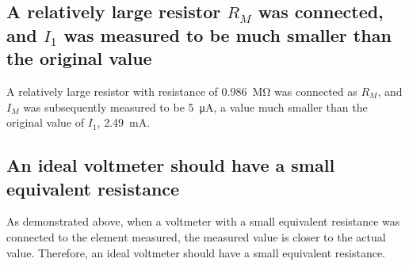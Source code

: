 \documentclass{article}
\begin{document}
\subsection{A relatively large resistor $R_M$ was connected, and $I_1$ was measured to be much smaller than the original value}
A relatively large resistor with resistance of \SI{0.986}{\mega\ohm} was connected as $R_M$, and $I_M$ was subsequently measured to be \SI{5}{\micro\ampere}, a value much smaller than the original value of $I_1$, \SI{2.49}{\milli\ampere}.

\subsection{An ideal voltmeter should have a small equivalent resistance}
As demonstrated above, when a voltmeter with a small equivalent resistance was connected to the element measured, the measured value is closer to the actual value. Therefore, an ideal voltmeter should have a small equivalent resistance.
\end{document}
